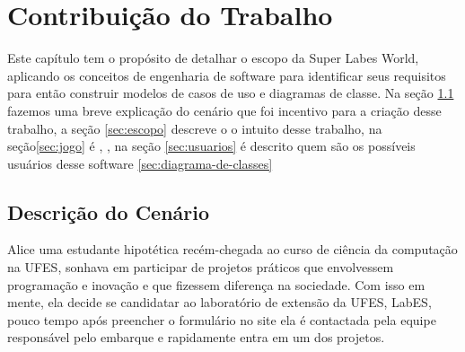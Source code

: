 \chapter{Contribuição do Trabalho}
\label{sec-contribuicao}



Este capítulo tem o propósito de detalhar o escopo da Super Labes World, aplicando os conceitos de engenharia de software para identificar seus requisitos para então construir modelos de casos de uso e diagramas de classe. Na seção \ref{sec:descricao-do-cenario} fazemos uma breve explicação do cenário que foi incentivo para a criação desse trabalho, a seção \ref{sec:escopo} descreve o o intuito desse trabalho, na seção\ref{sec:jogo} é ,  , na seção \ref{sec:usuarios} é descrito quem são os possíveis usuários desse software \ref{sec:diagrama-de-classes}
\section{Descrição do Cenário}
\label{sec:descricao-do-cenario}
Alice uma estudante hipotética recém-chegada ao curso de ciência da computação na UFES, sonhava em participar de projetos práticos que envolvessem programação e inovação e que fizessem diferença na sociedade. Com isso em mente, ela decide se candidatar ao laboratório de extensão da UFES, LabES, pouco tempo após preencher o formulário no site ela é contactada pela equipe responsável pelo embarque e rapidamente entra em um dos projetos.

